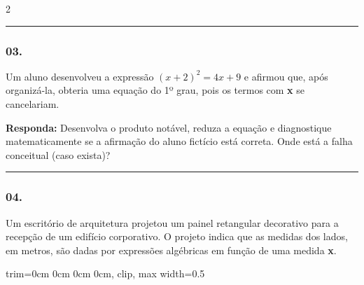 \documentclass[twoside, 10pt, a4paper]{article}
\newlength{\espacoPreQuestao}\setlength{\espacoPreQuestao}{0.1cm}
\newlength{\espacoQuestao}\setlength{\espacoQuestao}{0.2cm}
\newcommand{\larguraTikz}{0.85\linewidth}
\begin{document}
\begin{multicols*}{2}
\noindent\textcolor{CorLinha}{\rule{\linewidth}{0.5pt}} 
\par\vspace{\espacoPreQuestao}
\subsubsection*{03.} Um aluno desenvolveu a expressão $ (x + 2)^2 = 4x + 9 $ e afirmou que, após organizá-la, obteria uma equação do 1º grau, pois os termos com \textbf{x} se cancelariam.
\begin{boxresponda}
\textbf{Responda:} Desenvolva o produto notável, reduza a equação e diagnostique matematicamente se a afirmação do aluno fictício está correta. Onde está a falha conceitual (caso exista)?
\end{boxresponda}
\par\vspace{\espacoQuestao}

\noindent\textcolor{CorLinha}{\rule{\linewidth}{0.5pt}} 
\par\vspace{\espacoPreQuestao}
\subsubsection*{04.} Um escritório de arquitetura projetou um painel retangular decorativo para a recepção de um edifício corporativo. O projeto indica que as medidas dos lados, em metros, são dadas por expressões algébricas em função de uma medida \textbf{x}.

\begin{center}
\begin{adjustbox}{trim=0cm 0cm 0cm 0cm, clip, max width=0.5\linewidth}
\end{adjustbox}
\end{center}
\end{multicols*}
\end{document}

